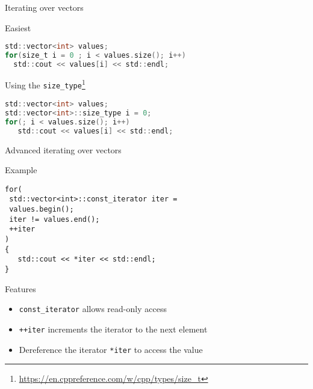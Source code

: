 \documentclass[12pt,t]{beamer}
\begin{document}
\begin{frame}[fragile]{Iterating over vectors}

\begin{block}{Easiest}
\begin{lstlisting}[language=C]
std::vector<int> values;
for(size_t i = 0 ; i < values.size(); i++)
  std::cout << values[i] << std::endl;
\end{lstlisting}
\end{block}

\begin{block}{Using the \lstinline|size_type|\footnote{\tiny\url{https://en.cppreference.com/w/cpp/types/size_t}}}
\begin{lstlisting}[language=C]
std::vector<int> values;
std::vector<int>::size_type i = 0;
for(; i < values.size(); i++)
   std::cout << values[i] << std::endl;
\end{lstlisting}
\end{block}

\end{frame}


\begin{frame}[fragile]{Advanced iterating over vectors}

\begin{block}{Example}
\begin{lstlisting}
for(
 std::vector<int>::const_iterator iter =
 values.begin();
 iter != values.end(); 
 ++iter
)
{
   std::cout << *iter << std::endl;
}
\end{lstlisting}
\end{block}
\begin{block}{Features}
\begin{itemize}
\item \lstinline|const_iterator| allows read-only access
\item \lstinline|++iter| increments the iterator to the next element
\item Dereference the iterator \lstinline|*iter| to access the value
\end{itemize}
\end{block}


\end{frame}
\end{document}
